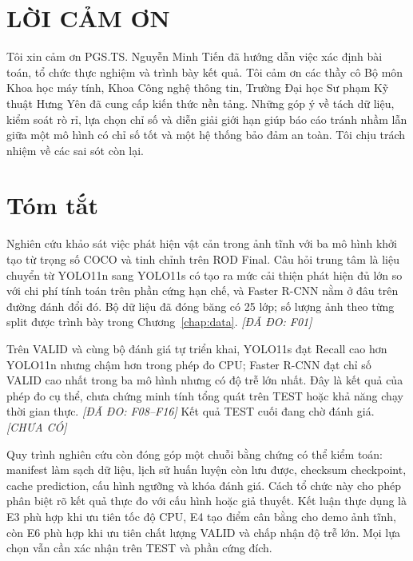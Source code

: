 \documentclass[12pt,a4paper,oneside]{report}
\newcommand{\measured}[1]{\textit{[ĐÃ ĐO: #1]}}
\newcommand{\missing}{\textit{[CHƯA CÓ]}}
\begin{document}
\chapter*{LỜI CẢM ƠN}
Tôi xin cảm ơn PGS.TS. Nguyễn Minh Tiến đã hướng dẫn việc xác định bài toán, tổ chức thực nghiệm và trình bày kết quả. Tôi cảm ơn các thầy cô Bộ môn Khoa học máy tính, Khoa Công nghệ thông tin, Trường Đại học Sư phạm Kỹ thuật Hưng Yên đã cung cấp kiến thức nền tảng. Những góp ý về tách dữ liệu, kiểm soát rò rỉ, lựa chọn chỉ số và diễn giải giới hạn giúp báo cáo tránh nhầm lẫn giữa một mô hình có chỉ số tốt và một hệ thống bảo đảm an toàn. Tôi chịu trách nhiệm về các sai sót còn lại.

\chapter*{Tóm tắt}
Nghiên cứu khảo sát việc phát hiện vật cản trong ảnh tĩnh với ba mô hình khởi tạo từ trọng số COCO và tinh chỉnh trên ROD Final. Câu hỏi trung tâm là liệu chuyển từ YOLO11n sang YOLO11s có tạo ra mức cải thiện phát hiện đủ lớn so với chi phí tính toán trên phần cứng hạn chế, và Faster R-CNN nằm ở đâu trên đường đánh đổi đó. Bộ dữ liệu đã đóng băng có 25 lớp; số lượng ảnh theo từng split được trình bày trong Chương~\ref{chap:data}. \measured{F01}

Trên VALID và cùng bộ đánh giá tự triển khai, YOLO11s đạt Recall cao hơn YOLO11n nhưng chậm hơn trong phép đo CPU; Faster R-CNN đạt chỉ số VALID cao nhất trong ba mô hình nhưng có độ trễ lớn nhất. Đây là kết quả của phép đo cụ thể, chưa chứng minh tính tổng quát trên TEST hoặc khả năng chạy thời gian thực. \measured{F08--F16} Kết quả TEST cuối đang chờ đánh giá. \missing

Quy trình nghiên cứu còn đóng góp một chuỗi bằng chứng có thể kiểm toán: manifest làm sạch dữ liệu, lịch sử huấn luyện còn lưu được, checksum checkpoint, cache prediction, cấu hình ngưỡng và khóa đánh giá. Cách tổ chức này cho phép phân biệt rõ kết quả thực đo với cấu hình hoặc giả thuyết. Kết luận thực dụng là E3 phù hợp khi ưu tiên tốc độ CPU, E4 tạo điểm cân bằng cho demo ảnh tĩnh, còn E6 phù hợp khi ưu tiên chất lượng VALID và chấp nhận độ trễ lớn. Mọi lựa chọn vẫn cần xác nhận trên TEST và phần cứng đích.

\tableofcontents
\listoftables
\listoffigures
\end{document}
